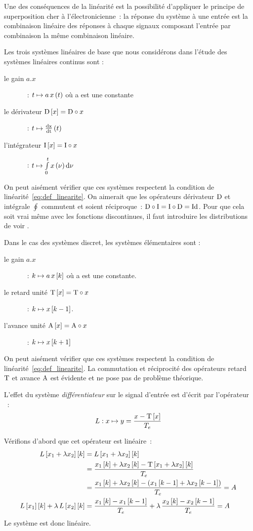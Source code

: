 Une des conséquences de la linéarité est la possibilité d'appliquer le
principe de superposition cher à l'électronicienne~: la réponse du
système à une entrée est la combinaison linéaire des réponses à chaque
signaux composant l'entrée par combinaison la même combinaison
linéaire.

Les trois systèmes linéaires de base que nous considérons dans
l'étude des systèmes linéaires continus sont :
\begin{description}
\item[le gain $a.x$]~: $t \mapsto a\,x\left(t\right)$ où a est une constante
\item[le dérivateur $\mathrm{D}\left[x\right]=\mathrm{D}\circ x$]~: $ t \mapsto \frac{\mathrm{d{x}}}{\mathrm{d{t}}}\left(t\right) $
\item[l'intégrateur $\mathrm{I}\left[x\right]=\mathrm{I}\circ x$]~: $ t \mapsto \int\limits_{0}^{t}{x\left(\nu\right)\mathrm{d{\nu}}}$ 
\end{description}
On peut aisément vérifier que ces systèmes respectent la condition de
linéarité~\ref{eq:def_linearite}. On aimerait que les opérateurs
dérivateur $\mathrm{D}$ et intégrale $\oint$ commutent et soient
réciproque~: $\mathrm{D}\circ\mathrm{I}=\mathrm{I}\circ\mathrm{D}=\mathrm{Id}$. Pour que cela soit
vrai même avec les fonctions discontinues, il faut introduire les
distributions de \Dirac{} voir .

Dans le cas des systèmes discret, les systèmes élémentaires sont :
\begin{description}
\item[le gain $a.x$]~: $ k \mapsto a\,x\left[k\right]$ où a est une constante.
\item[le retard unité $\mathrm{T}\left[x\right]=\mathrm{T}\circ x$]~: $ k \mapsto x\left[k-1\right]$.
\item[l'avance unité $\mathrm{A}\left[x\right]=\mathrm{A}\circ x$]~: $ k \mapsto x\left[k+1\right] $ 
\end{description}

On peut aisément vérifier que ces systèmes respectent la condition de
linéarité~\ref{eq:def_linearite}. La commutation et réciprocité des
opérateurs retard $\mathrm{T}$ et avance $\mathrm{A}$ est évidente et ne pose
pas de problème théorique.

\begin{exemple}
  \label{exemple:differentiateur_lineaire}
  L'effet du système \emph{différentiateur} sur le signal d'entrée est d'écrit par
  l'opérateur ~: $$L : x \mapsto y=\frac{x-\mathrm{T}\left[x\right]}{T_e}$$
  
  Vérifions d'abord que cet opérateur est linéaire~:
  \begin{eqnarray*}
    L\left[x_1+\lambda x_2\right]\left[k\right] &= L\left[x_1+\lambda x_2\right]\left[k\right]\\
                              &= \frac{x_1\left[k\right]+\lambda x_2\left[k\right] - \mathrm{T}\left[x_1+\lambda x_2\right]\left[k\right]}{T_e}\\
                              &= \frac{x_1\left[k\right]+\lambda x_2\left[k\right] - \left(x_1\left[k-1\right]+\lambda x_2\left[k-1\right]\right)}{T_e} = A\\
    L\left[x_{1}\right]\left[k\right]+\lambda\,L\left[x_{2}\right]\left[k\right]  &= \frac{x_1\left[k\right] - x_1\left[k-1\right]}{T_e}+\lambda\,\frac{x_2\left[k\right] - x_2\left[k-1\right]}{T_e}=A
  \end{eqnarray*}
  Le système est donc linéaire.
\end{exemple}


